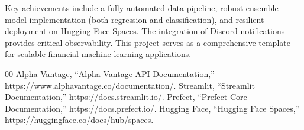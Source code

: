 \documentclass[conference]{IEEEtran}
\begin{document}
Key achievements include a fully automated data pipeline, robust ensemble model implementation (both regression and classification), and resilient deployment on Hugging Face Spaces. The integration of Discord notifications provides critical observability. This project serves as a comprehensive template for scalable financial machine learning applications.

\begin{thebibliography}{00}
 Alpha Vantage, ``Alpha Vantage API Documentation,'' https://www.alphavantage.co/documentation/.
 Streamlit, ``Streamlit Documentation,'' https://docs.streamlit.io/.
 Prefect, ``Prefect Core Documentation,'' https://docs.prefect.io/.
 Hugging Face, ``Hugging Face Spaces,'' https://huggingface.co/docs/hub/spaces.
\end{thebibliography}
\end{document}

